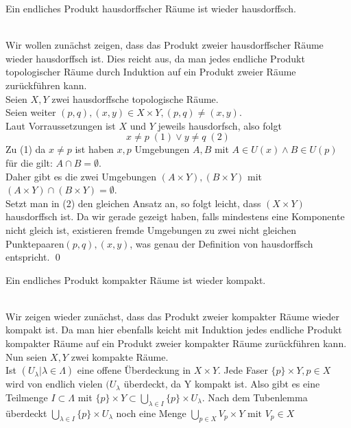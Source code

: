 	\begin{Satz}
		Ein endliches Produkt hausdorffscher Räume ist wieder hausdorffsch.
		
	\end{Satz}
		\\
		Wir wollen zunächst zeigen, dass das Produkt zweier hausdorffscher Räume wieder hausdorffsch ist. Dies reicht aus, da man jedes endliche Produkt topologischer Räume
		durch Induktion auf ein Produkt zweier Räume zurückführen kann. \\
		Seien \(X, Y\) zwei hausdorffsche topologische Räume.\\
		Seien weiter \( (p,q), (x,y) \in X \times Y, (p,q) \ne (x,y) \). \\
		Laut Vorraussetzungen ist \(X\) und \(Y\) jeweils hausdorfsch, also folgt 
		\[x \ne p \; (1) \lor y \ne q \; (2) \]
		Zu (1) da \(x \ne p \) ist haben \(x, p \) Umgebungen \(A, B \) mit \( A \in U(x)  \land B \in U(p) \) für die gilt: \(A \cap B = \emptyset \).\\ Daher gibt es die
		zwei Umgebungen \( (A \times Y), (B \times Y) \) mit \( (A \times Y) \cap (B \times Y) = \emptyset \). \\
		Setzt man in (2) den gleichen Ansatz an, so folgt leicht, dass \( (X \times Y) \) hausdorffsch ist. Da wir gerade gezeigt haben, falls mindestens eine Komponente
		nicht gleich ist,	existieren fremde Umgebungen zu zwei nicht gleichen Punktepaaren\( (p,q), (x,y) \), was genau der Definition von hausdorffsch entspricht.
	\qed
	\\
	\begin{Satz}
		Ein endliches Produkt kompakter Räume ist wieder kompakt.
		
	\end{Satz}
	\\
	Wir zeigen wieder zunächst, dass das Produkt zweier kompakter Räume wieder kompakt ist. Da man hier ebenfalls keicht mit Induktion jedes endliche Produkt kompakter Räume 
	auf ein Produkt zweier kompakter Räume zurückführen kann. \\
	Nun seien \(X, Y\) zwei kompakte Räume.\\
	Ist \((U_{\lambda} | \lambda \in \Lambda) \) eine offene Überdeckung in \(X \times Y \). Jede Faser \( \{p\} \times Y, p \in X \) wird von endlich vielen \((U_{\lambda} \) überdeckt,
	da Y kompakt ist. Also gibt es eine Teilmenge \( I \subset \Lambda \) mit \( \{p\} \times Y \subset \bigcup_{ \lambda \in I } \{p\} \times U_{\lambda} \). 
	Nach dem Tubenlemma überdeckt \( \bigcup_{ \lambda \in I } \{p\} \times U_{\lambda} \) noch eine Menge \(\bigcup_{ p \in X } V_{p} \times Y \mbox{ mit } V_{p} \in X \) 
